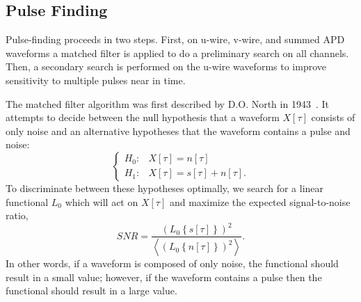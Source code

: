 \subsection{Pulse Finding}\label{sec:ReconPulseFinding}

Pulse-finding proceeds in two steps.  First, on u-wire, v-wire, and summed APD waveforms a matched filter is applied to do a preliminary search on all channels.  Then, a secondary search is performed on the u-wire waveforms to improve sensitivity to multiple pulses near in time.

The matched filter algorithm was first described by D.O. North in 1943~\cite{MatchedFilterPaper}.  It attempts to decide between the null hypothesis that a waveform $X[\tau]$ consists of only noise and an alternative hypotheses that the waveform contains a pulse and noise:
\begin{equation}\begin{cases}
H_0: & X[\tau] = n[\tau]\\
H_1: & X[\tau] = s[\tau] + n[\tau].
\end{cases}\end{equation}
To discriminate between these hypotheses optimally, we search for a linear functional $L_0$ which will act on $X[\tau]$ and maximize the expected signal-to-noise ratio,
\begin{equation}
SNR = \frac{\left(L_0\left\{s[\tau]\right\}\right)^2} {\left<\left(L_0\left\{n[\tau]\right\}\right)^2\right>}.
\end{equation}
In other words, if a waveform is composed of only noise, the functional should result in a small value; however, if the waveform contains a pulse then the functional should result in a large value.

